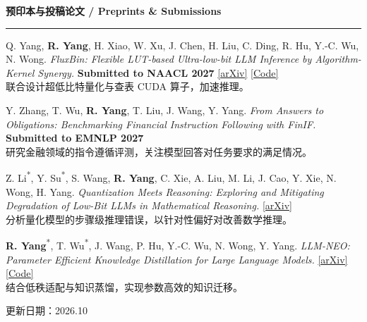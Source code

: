 \documentclass[UTF8,fontset=fandol,11pt,a4paper]{ctexart}
\newcommand{\submissionbadge}[1]{\begingroup\setlength{\fboxsep}{1.5pt}\colorbox{submissionfill}{\textcolor{venuetext}{\bfseries #1}}\endgroup}
\newenvironment{rSection}[1]{
  \Needspace{7\baselineskip}\medskip
  \textbf{#1}\smallskip\hrule\smallskip
}{\par}
\begin{document}
\begin{rSection}{预印本与投稿论文 / Preprints \& Submissions}
\begin{enumerate}[label={[P\arabic*]}]
\item\begin{samepage} Q. Yang, \textbf{R. Yang}, H. Xiao, W. Xu, J. Chen, H. Liu, C. Ding, R. Hu, Y.-C. Wu, N. Wong. \textit{FluxBin: Flexible LUT-based Ultra-low-bit LLM Inference by Algorithm-Kernel Synergy.} \submissionbadge{Submitted to NAACL 2027} \href{https://arxiv.org/abs/2608.15602}{[arXiv]} \href{https://github.com/nicyyyy/FluxBin}{[Code]}\\[1pt]{\textcolor{summarytext}{联合设计超低比特量化与查表 CUDA 算子，加速推理。}}\par\end{samepage}
\item\begin{samepage} Y. Zhang, T. Wu, \textbf{R. Yang}, T. Liu, J. Wang, Y. Yang. \textit{From Answers to Obligations: Benchmarking Financial Instruction Following with FinIF.} \submissionbadge{Submitted to EMNLP 2027} \\[1pt]{\textcolor{summarytext}{研究金融领域的指令遵循评测，关注模型回答对任务要求的满足情况。}}\par\end{samepage}
\item\begin{samepage} Z. Li\textsuperscript{*}, Y. Su\textsuperscript{*}, S. Wang, \textbf{R. Yang}, C. Xie, A. Liu, M. Li, J. Cao, Y. Xie, N. Wong, H. Yang. \textit{Quantization Meets Reasoning: Exploring and Mitigating Degradation of Low-Bit LLMs in Mathematical Reasoning.}  \href{https://arxiv.org/abs/2505.11574}{[arXiv]}\\[1pt]{\textcolor{summarytext}{分析量化模型的步骤级推理错误，以针对性偏好对改善数学推理。}}\par\end{samepage}
\item\begin{samepage} \textbf{R. Yang}\textsuperscript{*}, T. Wu\textsuperscript{*}, J. Wang, P. Hu, Y.-C. Wu, N. Wong, Y. Yang. \textit{LLM-NEO: Parameter Efficient Knowledge Distillation for Large Language Models.}  \href{https://arxiv.org/abs/2411.06839}{[arXiv]} \href{https://github.com/yang3121099/LLM-Neo}{[Code]}\\[1pt]{\textcolor{summarytext}{结合低秩适配与知识蒸馏，实现参数高效的知识迁移。}}\par\end{samepage}
\end{enumerate}\end{rSection}\normalsize
\par\vspace{2pt}{\parfillskip=0pt\noindent\rule{\linewidth}{0.4pt}\par}
\begin{center}\footnotesize 更新日期：2026.10\end{center}
\end{document}
